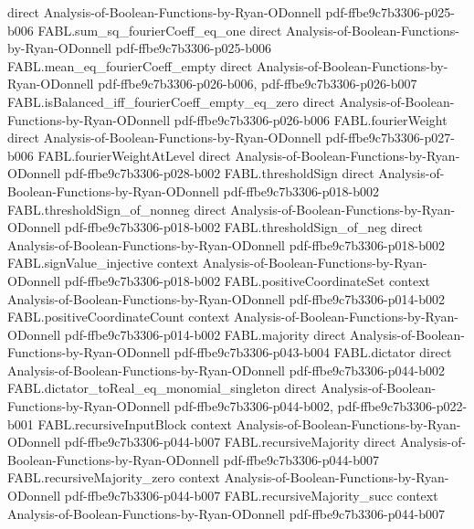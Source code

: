 \begin{theorem}
  {direct}
  {Analysis-of-Boolean-Functions-by-Ryan-ODonnell}
  {pdf-ffbe9c7b3306-p025-b006}
\proofstep
  {FABL.sum_sq_fourierCoeff_eq_one}
  {direct}
  {Analysis-of-Boolean-Functions-by-Ryan-ODonnell}
  {pdf-ffbe9c7b3306-p025-b006}
\proofstep
  {FABL.mean_eq_fourierCoeff_empty}
  {direct}
  {Analysis-of-Boolean-Functions-by-Ryan-ODonnell}
  {pdf-ffbe9c7b3306-p026-b006,
    pdf-ffbe9c7b3306-p026-b007}
\proofstep
  {FABL.isBalanced_iff_fourierCoeff_empty_eq_zero}
  {direct}
  {Analysis-of-Boolean-Functions-by-Ryan-ODonnell}
  {pdf-ffbe9c7b3306-p026-b006}
\proofstep
  {FABL.fourierWeight}
  {direct}
  {Analysis-of-Boolean-Functions-by-Ryan-ODonnell}
  {pdf-ffbe9c7b3306-p027-b006}
\proofstep
  {FABL.fourierWeightAtLevel}
  {direct}
  {Analysis-of-Boolean-Functions-by-Ryan-ODonnell}
  {pdf-ffbe9c7b3306-p028-b002}
\proofstep
  {FABL.thresholdSign}
  {direct}
  {Analysis-of-Boolean-Functions-by-Ryan-ODonnell}
  {pdf-ffbe9c7b3306-p018-b002}
\proofstep
  {FABL.thresholdSign_of_nonneg}
  {direct}
  {Analysis-of-Boolean-Functions-by-Ryan-ODonnell}
  {pdf-ffbe9c7b3306-p018-b002}
\proofstep
  {FABL.thresholdSign_of_neg}
  {direct}
  {Analysis-of-Boolean-Functions-by-Ryan-ODonnell}
  {pdf-ffbe9c7b3306-p018-b002}
\proofstep
  {FABL.signValue_injective}
  {context}
  {Analysis-of-Boolean-Functions-by-Ryan-ODonnell}
  {pdf-ffbe9c7b3306-p018-b002}
\proofstep
  {FABL.positiveCoordinateSet}
  {context}
  {Analysis-of-Boolean-Functions-by-Ryan-ODonnell}
  {pdf-ffbe9c7b3306-p014-b002}
\proofstep
  {FABL.positiveCoordinateCount}
  {context}
  {Analysis-of-Boolean-Functions-by-Ryan-ODonnell}
  {pdf-ffbe9c7b3306-p014-b002}
\proofstep
  {FABL.majority}
  {direct}
  {Analysis-of-Boolean-Functions-by-Ryan-ODonnell}
  {pdf-ffbe9c7b3306-p043-b004}
\proofstep
  {FABL.dictator}
  {direct}
  {Analysis-of-Boolean-Functions-by-Ryan-ODonnell}
  {pdf-ffbe9c7b3306-p044-b002}
\proofstep
  {FABL.dictator_toReal_eq_monomial_singleton}
  {direct}
  {Analysis-of-Boolean-Functions-by-Ryan-ODonnell}
  {pdf-ffbe9c7b3306-p044-b002,
    pdf-ffbe9c7b3306-p022-b001}
\proofstep
  {FABL.recursiveInputBlock}
  {context}
  {Analysis-of-Boolean-Functions-by-Ryan-ODonnell}
  {pdf-ffbe9c7b3306-p044-b007}
\proofstep
  {FABL.recursiveMajority}
  {direct}
  {Analysis-of-Boolean-Functions-by-Ryan-ODonnell}
  {pdf-ffbe9c7b3306-p044-b007}
\proofstep
  {FABL.recursiveMajority_zero}
  {context}
  {Analysis-of-Boolean-Functions-by-Ryan-ODonnell}
  {pdf-ffbe9c7b3306-p044-b007}
\proofstep
  {FABL.recursiveMajority_succ}
  {context}
  {Analysis-of-Boolean-Functions-by-Ryan-ODonnell}
  {pdf-ffbe9c7b3306-p044-b007}
\proofstep

\end{theorem}
